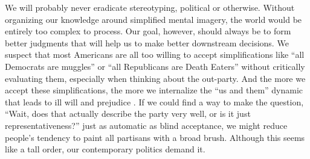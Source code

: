 \documentclass[12pt, letterpaper]{article}
\begin{document}
We will probably never eradicate stereotyping, political or otherwise. Without organizing our knowledge around simplified mental imagery, the world would be entirely too complex to process. Our goal, however, should always be to form better judgments that will help us to make better downstream decisions. We suspect that most Americans are all too willing to accept simplifications like ``all Democrats are muggles'' or ``all Republicans are Death Eaters'' without critically evaluating them, especially when thinking about the out-party. And the more we accept these simplifications, the more we internalize the ``us and them'' dynamic that leads to ill will and prejudice \citep[e.g.,][]{lepore1997category}. If we could find a way to make the question, ``Wait, does that actually describe the party very well, or is it just representativeness?'' just as automatic as blind acceptance, we might reduce people's tendency to paint all partisans with a broad brush. Although this seems like a tall order, our contemporary politics demand it.

\clearpage



\end{document}

